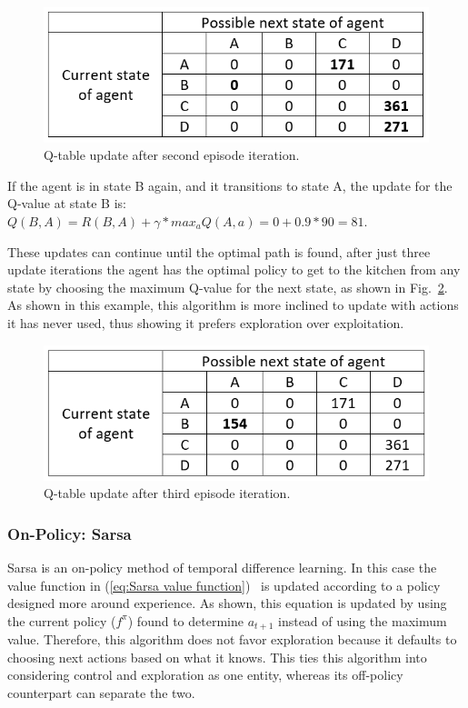 \documentclass[12pt,american]{report}
\begin{document}
\begin{figure}
\centering
\includegraphics[scale=1.5]{images/q-table-update-2.png}
\caption{Q-table update after second episode iteration.}
\label{fig:q-table-update-2}
\end{figure}
If the agent is in state B again, and it transitions to state A, the update for the Q-value at state B is: \\
$Q(B,A) = R(B,A) + \gamma*max_a Q(A,a) = 0 + 0.9*90 = 81$.

These updates can continue until the optimal path is found, after just three update iterations the agent has the optimal policy to get to the kitchen from any state by choosing the maximum Q-value for the next state, as shown in Fig.~\ref{fig:q-table-update-3}. As shown in this example, this algorithm is more inclined to update with actions it has never used, thus showing it prefers exploration over exploitation.
\begin{figure}
\centering
\includegraphics[scale=1.5]{images/q-table-update-3.png}
\caption{Q-table update after third episode iteration.}
\label{fig:q-table-update-3}
\end{figure}

        
        \subsubsection{On-Policy: Sarsa}
        Sarsa is an on-policy method of temporal difference learning. In this case the value function in (\ref{eq:Sarsa value function})~\cite{sprague2003multiple} is updated according to a policy designed more around experience. As shown, this equation is updated by using the current policy ($f^{\pi}$) found to determine $a_{t+1}$ instead of using the maximum value.  Therefore, this algorithm does not favor exploration because it defaults to choosing next actions based on what it knows. This ties this algorithm into considering control and exploration as one entity, whereas its off-policy counterpart can separate the two.
        
\end{document}
